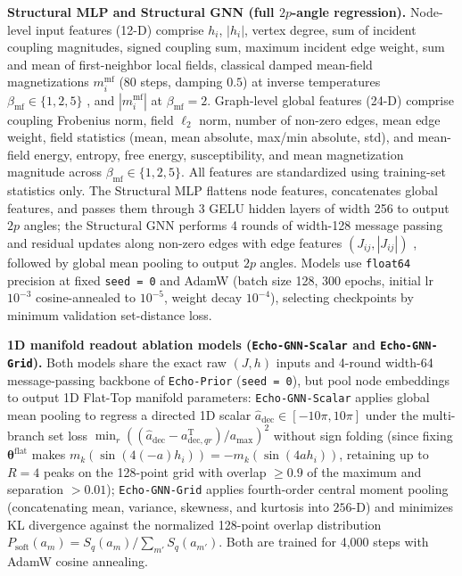 \documentclass{article}
\theoremstyle{plain}
\theoremstyle{definition}
\begin{document}
\textbf{Structural MLP and Structural GNN (full $2p$-angle regression).} Node-level input features (12-D) comprise $h_i$, $|h_i|$, vertex degree, sum of incident coupling magnitudes, signed coupling sum, maximum incident edge weight, sum and mean of first-neighbor local fields, classical damped mean-field magnetizations $m_i^{\mathrm{mf}}$ (80 steps, damping $0.5$) at inverse temperatures $\beta_{\mathrm{mf}}\in\{1,2,5\}$ \citep{wainwright2008graphical}, and $|m_i^{\mathrm{mf}}|$ at $\beta_{\mathrm{mf}}=2$. Graph-level global features (24-D) comprise coupling Frobenius norm, field $\ell_2$ norm, number of non-zero edges, mean edge weight, field statistics (mean, mean absolute, max/min absolute, std), and mean-field energy, entropy, free energy, susceptibility, and mean magnetization magnitude across $\beta_{\mathrm{mf}}\in\{1,2,5\}$. All features are standardized using training-set statistics only. The Structural MLP flattens node features, concatenates global features, and passes them through 3 GELU hidden layers of width 256 to output $2p$ angles; the Structural GNN performs 4 rounds of width-128 message passing and residual updates along non-zero edges with edge features $(J_{ij}, |J_{ij}|)$ \citep{gilmer2017neural,xu2019how}, followed by global mean pooling to output $2p$ angles. Models use \texttt{float64} precision at fixed \texttt{seed = 0} and AdamW \citep{loshchilov2019decoupled} (batch size 128, 300 epochs, initial lr $10^{-3}$ cosine-annealed to $10^{-5}$, weight decay $10^{-4}$), selecting checkpoints by minimum validation set-distance loss.

\textbf{1D manifold readout ablation models (\texttt{Echo-GNN-Scalar} and \texttt{Echo-GNN-Grid}).} Both models share the exact raw $(J,h)$ inputs and 4-round width-64 message-passing backbone of \texttt{Echo-Prior} (\texttt{seed = 0}), but pool node embeddings to output 1D Flat-Top manifold parameters: \texttt{Echo-GNN-Scalar} applies global mean pooling to regress a directed 1D scalar $\widehat a_{\mathrm{dec}}\in[-10\pi,10\pi]$ under the multi-branch set loss $\min_r((\widehat a_{\mathrm{dec}}-a_{\mathrm{dec},qr}^{\mathrm T})/a_{\max})^2$ without sign folding (since fixing $\boldsymbol{\theta}^{\mathrm{flat}}$ makes $m_k(\sin(4(-a)h_i))=-m_k(\sin(4ah_i))$, retaining up to $R=4$ peaks on the 128-point grid with overlap $\ge 0.9$ of the maximum and separation $>0.01$); \texttt{Echo-GNN-Grid} applies fourth-order central moment pooling (concatenating mean, variance, skewness, and kurtosis into $256$-D) and minimizes KL divergence against the normalized 128-point overlap distribution $P_{\mathrm{soft}}(a_m)=S_q(a_m)/\sum_{m'}S_q(a_{m'})$. Both are trained for 4,000 steps with AdamW cosine annealing.
\end{document}
